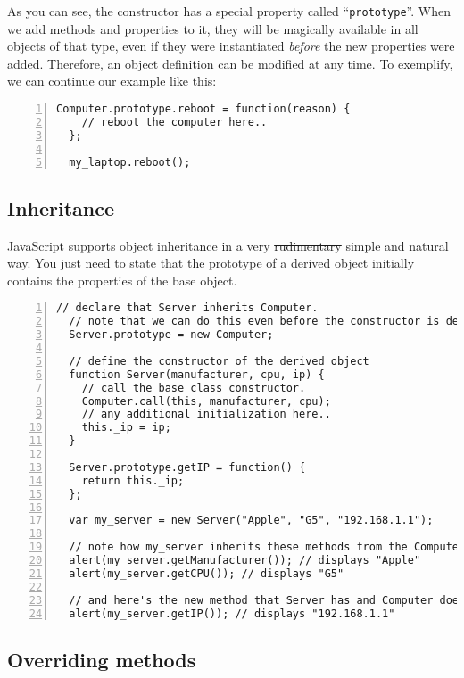 As you can see, the constructor has a special property called
“\lstinline{prototype}”.  When we add methods and properties to it, they will
be magically available in all objects of that type, even if they were
instantiated \textit{before} the new properties were added.  Therefore, an
object definition can be modified at any time.  To exemplify, we can continue
our example like this:

\begin{lstlisting}[nolol,name=ObjectSample1,numbers=left]
  Computer.prototype.reboot = function(reason) {
    // reboot the computer here..
  };

  my_laptop.reboot();
\end{lstlisting}

\subsection{Inheritance}

JavaScript supports object inheritance in a very \sout{rudimentary} simple and
natural way.  You just need to state that the prototype of a derived object
initially contains the properties of the base object.

\begin{lstlisting}[nolol,name=ObjectSample1,numbers=left]
  // declare that Server inherits Computer.
  // note that we can do this even before the constructor is defined.
  Server.prototype = new Computer;

  // define the constructor of the derived object
  function Server(manufacturer, cpu, ip) {
    // call the base class constructor.
    Computer.call(this, manufacturer, cpu);
    // any additional initialization here..
    this._ip = ip;
  }

  Server.prototype.getIP = function() {
    return this._ip;
  };

  var my_server = new Server("Apple", "G5", "192.168.1.1");

  // note how my_server inherits these methods from the Computer object
  alert(my_server.getManufacturer()); // displays "Apple"
  alert(my_server.getCPU()); // displays "G5"

  // and here's the new method that Server has and Computer doesn't
  alert(my_server.getIP()); // displays "192.168.1.1"
\end{lstlisting}

\subsection{Overriding methods}

